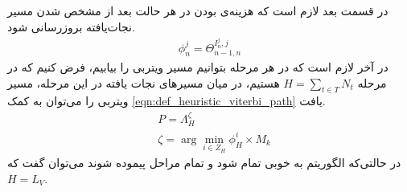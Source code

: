 در قسمت بعد لازم است که هزینه‌ی بودن در هر حالت بعد از مشخص شدن مسیر نجات‌یافته بروزرسانی شود. 
\begin{align}\label{eqn:heuristic:def_phi}
	\phi_n^j = \Theta_{n-1,n}^{I_n^j,j}
\end{align}
در آخر لازم است که در هر مرحله بتوانیم مسیر ویتربی را بیابیم، فرض کنیم که در مرحله $\displaystyle H = \sum_{t \in T}N_t$ هستیم، در میان مسیرهای نجات یافته در این مرحله، مسیر ویتربی را می‌توان به کمک \cref{eqn:def_heuristic_viterbi_path} یافت.
\begin{subequations}
	\begin{align}\label{eqn:heuristic:def_viterbi_path}
		&P = \Lambda_H^\zeta \\
		&\zeta = \arg \min_{i \in Z_H} \phi_H^i \times M_k
	\end{align}
\end{subequations}
در حالتی‌که الگوریتم به خوبی تمام شود و تمام مراحل پیموده شوند می‌توان گفت که $H=L_V$.
